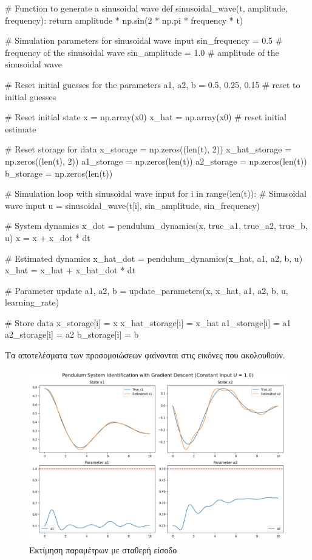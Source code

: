\documentclass{article}
\begin{document}
\clearpage
{}
\begin{python}
# Function to generate a sinusoidal wave
def sinusoidal_wave(t, amplitude, frequency):
    return amplitude * np.sin(2 * np.pi * frequency * t)

# Simulation parameters for sinusoidal wave input
sin_frequency = 0.5  # frequency of the sinusoidal wave
sin_amplitude = 1.0  # amplitude of the sinusoidal wave

# Reset initial guesses for the parameters
a1, a2, b = 0.5, 0.25, 0.15  # reset to initial guesses

# Reset initial state
x = np.array(x0)
x_hat = np.array(x0)  # reset initial estimate

# Reset storage for data
x_storage = np.zeros((len(t), 2))
x_hat_storage = np.zeros((len(t), 2))
a1_storage = np.zeros(len(t))
a2_storage = np.zeros(len(t))
b_storage = np.zeros(len(t))

# Simulation loop with sinusoidal wave input
for i in range(len(t)):
    # Sinusoidal wave input
    u = sinusoidal_wave(t[i], sin_amplitude, sin_frequency)

    # System dynamics
    x_dot = pendulum_dynamics(x, true_a1, true_a2, true_b, u)
    x = x + x_dot * dt

    # Estimated dynamics
    x_hat_dot = pendulum_dynamics(x_hat, a1, a2, b, u)
    x_hat = x_hat + x_hat_dot * dt

    # Parameter update
    a1, a2, b = update_parameters(x, x_hat, a1, a2, b, u, learning_rate)

    # Store data
    x_storage[i] = x
    x_hat_storage[i] = x_hat
    a1_storage[i] = a1
    a2_storage[i] = a2
    b_storage[i] = b
\end{python}

Τα αποτελέσματα των προσομοιώσεων φαίνονται στις εικόνες που ακολουθούν.

\begin{figure}[h]
    \centering
    \includegraphics[width=\textwidth]{./estimation-const-unit-input.png}
    \caption{Εκτίμηση παραμέτρων με σταθερή είσοδο}
\end{figure}
\FloatBarrier
\end{document}
